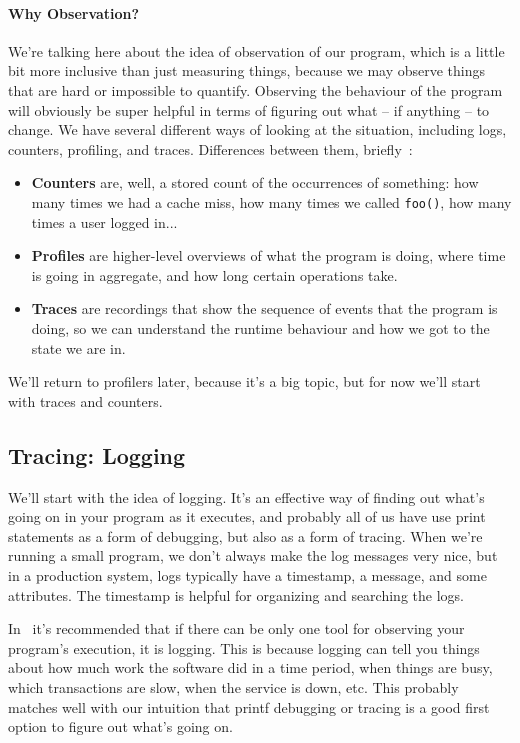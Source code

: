 \paragraph{Why Observation?} We're talking here about the idea of observation of our program, which is a little bit more inclusive than just measuring things, because we may observe things that are hard or impossible to quantify. Observing the behaviour of the program will obviously be super helpful in terms of figuring out what -- if anything -- to change. We have several different ways of looking at the situation, including logs, counters, profiling, and traces. Differences between them, briefly~\cite{usd}:

\begin{itemize}
	\item \textbf{Counters} are, well, a stored count of the occurrences of something: how many times we had a cache miss, how many times we called \texttt{foo()}, how many times a user logged in...
	\item \textbf{Profiles} are higher-level overviews of what the program is doing, where time is going in aggregate, and how long certain operations take.
	\item \textbf{Traces} are recordings that show the sequence of events that the program is doing, so we can understand the runtime behaviour and how we got to the state we are in.
\end{itemize}

We'll return to profilers later, because it's a big topic, but for now we'll start with traces and counters.

\subsection*{Tracing: Logging}
We'll start with the idea of logging. It's an effective way of finding out what's going on in your program as it executes, and probably all of us have use print statements as a form of debugging, but also as a form of tracing. When we're running a small program, we don't always make the log messages very nice, but in a production system, logs typically have a timestamp, a message, and some attributes. The timestamp is helpful for organizing and searching the logs. 

In~\cite{usd} it's recommended that if there can be only one tool for observing your program's execution, it is logging. This is because logging can tell you things about how much work the software did in a time period, when things are busy, which transactions are slow, when the service is down, etc. This probably matches well with our intuition that printf debugging or tracing is a good first option to figure out what's going on.

